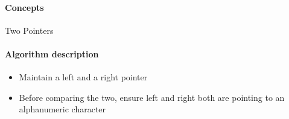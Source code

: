 \documentclass[11pt]{book}
\begin{document}
\paragraph{Concepts}
Two Pointers
\paragraph{Algorithm description}
\begin{itemize}
    \item Maintain a left and a right pointer
    \item Before comparing the two, ensure left and right both are pointing to an
    alphanumeric character
\end{itemize}


\end{document}
